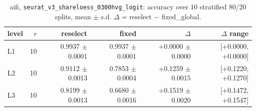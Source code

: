 \begin{table}[t]
\centering
\small
\begin{tabular}{lrrrrr}
\toprule
level & $r$ & reselect & fixed & $\Delta$ & $\Delta$ range \\
\midrule
L1 & 10 & 0.9937 $\pm$ 0.0001 & 0.9937 $\pm$ 0.0001 & +0.0000 $\pm$ 0.0000 & [+0.0000, +0.0000] \\
L2 & 10 & 0.9112 $\pm$ 0.0013 & 0.7853 $\pm$ 0.0004 & +0.1259 $\pm$ 0.0015 & [+0.1220, +0.1270] \\
L3 & 10 & 0.8199 $\pm$ 0.0013 & 0.6680 $\pm$ 0.0016 & +0.1519 $\pm$ 0.0020 & [+0.1472, +0.1547] \\
\bottomrule
\end{tabular}
\caption{aifi, \texttt{seurat\_v3\_shareloess\_0300hvg\_logit}: accuracy over 10 stratified 80/20 splits, mean $\pm$ s.d. $\Delta$ = reselect $-$ fixed\_global.}
\label{tab:repeats-aifi-accuracy}
\end{table}